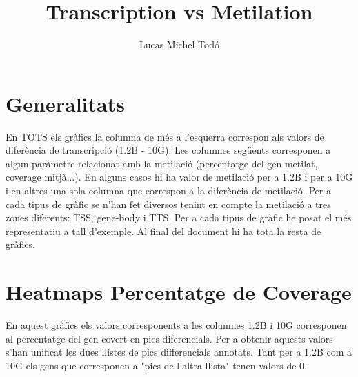 \documentclass{article}\usepackage[]{graphicx}\usepackage[]{color}
\begin{document}
\title{Transcription vs Metilation}
\author{Lucas Michel Todó}
\maketitle
\tableofcontents
\clearpage



\section{Generalitats}
En TOTS els gràfics la columna de més a l'esquerra correspon als valors de diferència de transcripció (1.2B - 10G). Les columnes següents corresponen a algun paràmetre relacionat amb la metilació (percentatge del gen metilat, coverage mitjà...). En alguns casos hi ha valor de metilació per a 1.2B i per a 10G i en altres una sola columna que correspon a la diferència de metilació. Per a cada tipus de gràfic se n'han fet diversos tenint en compte la metilació a tres zones diferents: TSS, gene-body i TTS. Per a cada tipus de gràfic he posat el més representatiu a tall d'exemple. Al final del document hi ha tota la resta de gràfics.
\clearpage


\section{Heatmaps Percentatge de Coverage}
En aquest gràfics els valors corresponents a les columnes 1.2B i 10G corresponen al percentatge del gen covert en pics diferencials. Per a obtenir aquests valors s'han unificat les dues llistes de pics differencials annotats. Tant per a 1.2B com a 10G els gens que corresponen a "pics de l'altra llista" tenen valors de 0.
\end{document}
